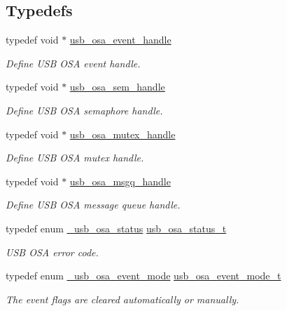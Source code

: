 \subsection*{Typedefs}
\begin{DoxyCompactItemize}
\item 
typedef void $\ast$ \hyperlink{group__usb__os__abstraction_gaa5faa1787d0c772a2cf101b3eaf654f6}{usb\-\_\-osa\-\_\-event\-\_\-handle}
\begin{DoxyCompactList}\small\item\em Define U\-S\-B O\-S\-A event handle. \end{DoxyCompactList}\item 
typedef void $\ast$ \hyperlink{group__usb__os__abstraction_ga9f0e38944e1320d10c45eaacb67185b7}{usb\-\_\-osa\-\_\-sem\-\_\-handle}
\begin{DoxyCompactList}\small\item\em Define U\-S\-B O\-S\-A semaphore handle. \end{DoxyCompactList}\item 
typedef void $\ast$ \hyperlink{group__usb__os__abstraction_gad259d0dfe125b11cccaf93163ef915fd}{usb\-\_\-osa\-\_\-mutex\-\_\-handle}
\begin{DoxyCompactList}\small\item\em Define U\-S\-B O\-S\-A mutex handle. \end{DoxyCompactList}\item 
typedef void $\ast$ \hyperlink{group__usb__os__abstraction_gab3a9f26ba50f3abea7fcbac07500cbb8}{usb\-\_\-osa\-\_\-msgq\-\_\-handle}
\begin{DoxyCompactList}\small\item\em Define U\-S\-B O\-S\-A message queue handle. \end{DoxyCompactList}\item 
typedef enum \hyperlink{group__usb__os__abstraction_ga453ebd2f93aafb8c938c3a23c815f9bd}{\-\_\-usb\-\_\-osa\-\_\-status} \hyperlink{group__usb__os__abstraction_ga8de2fb7579de0a6621bbc1776519b0a9}{usb\-\_\-osa\-\_\-status\-\_\-t}
\begin{DoxyCompactList}\small\item\em U\-S\-B O\-S\-A error code. \end{DoxyCompactList}\item 
typedef enum \hyperlink{group__usb__os__abstraction_gaf3dc48c688f7c71cce122a1a0d4a12bd}{\-\_\-usb\-\_\-osa\-\_\-event\-\_\-mode} \hyperlink{group__usb__os__abstraction_gaa3f24eb2797924d385f01a78695b645c}{usb\-\_\-osa\-\_\-event\-\_\-mode\-\_\-t}
\begin{DoxyCompactList}\small\item\em The event flags are cleared automatically or manually. \end{DoxyCompactList}\end{DoxyCompactItemize}
